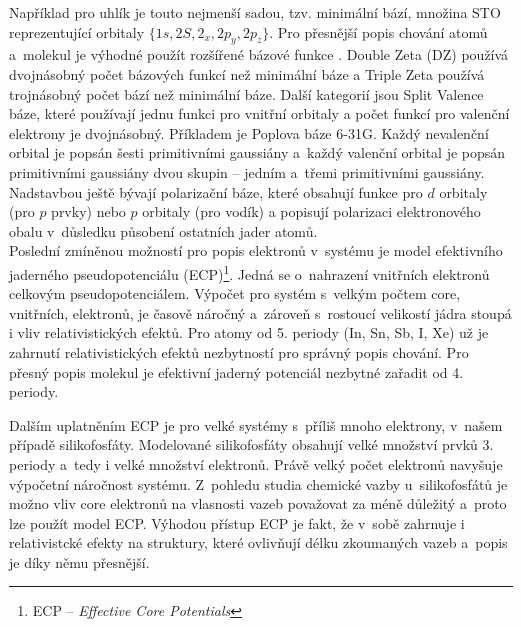 \documentclass[
digital, %
table,   %
nolof,     %
nolot,     %
oneside,
]{fithesis3}
\begin{document}
Například pro uhlík je touto nejmenší sadou, tzv. minimální bází, množina STO reprezentující orbitaly $\{1s, 2S, 2_x, 2p_y, 2p_z \}$. Pro přesnější popis chování atomů a~molekul je výhodné použít rozšířené bázové funkce \cite{lowe2011quantum}.
Double Zeta (DZ) používá dvojnásobný počet bázových funkcí než minimální báze a Triple Zeta používá trojnásobný počet bází než minimální báze. Další kategorií jsou Split Valence báze, které používají jednu funkci pro vnitřní orbitaly a počet funkcí pro valenční elektrony je dvojnásobný. Příkladem je Poplova báze 6-31G. Každý nevalenční orbital je popsán šesti primitivními gaussiány a~každý valenční orbital je popsán primitivními gaussiány dvou skupin -- jedním a~třemi primitivními gaussiány. Nadstavbou ještě bývají polarizační báze, které obsahují funkce pro $d$ orbitaly (pro $p$ prvky) nebo $p$ orbitaly (pro vodík) a popisují polarizaci elektronového obalu v~důsledku působení ostatních jader atomů. \\

Poslední zmíněnou možností pro popis elektronů v~systému je model efektivního jaderného pseudopotenciálu (ECP)\footnote{ECP -- \textit{Effective Core Potentials}}. Jedná se o~nahrazení vnitřních elektronů celkovým pseudopotenciálem. Výpočet pro systém s~velkým počtem core, vnitřních, elektronů, je časově náročný a~zároveň s~rostoucí velikostí jádra stoupá i vliv relativistických efektů. Pro atomy od 5. periody (In, Sn, Sb, I, Xe) už je zahrnutí relativistických efektů nezbytností pro správný popis chování. Pro přesný popis molekul je efektivní jaderný potenciál nezbytné zařadit od 4. periody.

Dalším uplatněním ECP je pro velké systémy s~příliš mnoho elektrony, v~našem případě silikofosfáty. Modelované silikofosfáty obsahují velké množství prvků 3. periody a~tedy i velké množství elektronů. Právě velký počet elektronů navyšuje výpočetní náročnost systému. Z~pohledu studia chemické vazby u~silikofosfátů je možno vliv core elektronů na vlasnosti vazeb považovat za méně důležitý a~proto lze použít model ECP. Výhodou přístup ECP je fakt, že v~sobě zahrnuje i relativistcké efekty na struktury, které ovlivňují délku zkoumaných vazeb a~popis je díky němu přesnější.
\end{document}
